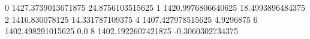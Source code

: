 0 1427.3739013671875 24.8756103515625
1 1420.9976806640625 18.4993896484375
2 1416.830078125 14.331787109375
4 1407.427978515625 4.9296875
6 1402.498291015625 0.0
8 1402.1922607421875 -0.3060302734375
